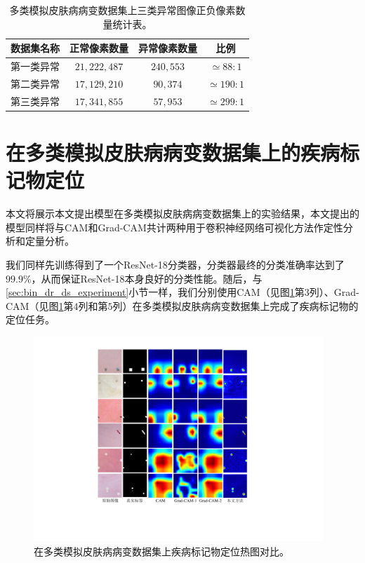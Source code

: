 \begin{table}[h]
	\centering
	\caption[多类模拟皮肤病病变数据集上三类异常图像正负像素数量统计表]{多类模拟皮肤病病变数据集上三类异常图像正负像素数量统计表。}
	\label{tab:multi_ds_pixel_freqs}
	\begin{tabular}{c|c|c|c}
		\toprule[2pt]
		数据集名称 & 正常像素数量 & 异常像素数量 & 比例 \\
		\midrule[2pt]
		第一类异常&  $21,222,487$ & $240,553$ & $\simeq 88: 1$ \\ \hline
		第二类异常&  $17,129,210$ & $90,374$ & $\simeq 190: 1$ \\ \hline
		第三类异常 & $17,341,855$ & $57,953$ & $\simeq 299: 1$ \\
		\bottomrule[2pt]
	\end{tabular}
\end{table}
\section{在多类模拟皮肤病病变数据集上的疾病标记物定位}\label{sec:multi_classes_experiments_res}
本文将展示本文提出模型在多类模拟皮肤病病变数据集上的实验结果，本文提出的模型同样将与CAM和Grad-CAM共计两种用于卷积神经网络可视化方法作定性分析和定量分析。

我们同样先训练得到了一个ResNet-18分类器，分类器最终的分类准确率达到了$99.9\%$，从而保证ResNet-18本身良好的分类性能。随后，与\ref{sec:bin_dr_ds_experiment}小节一样，我们分别使用CAM（见图\ref{fig:multi_simulated_skin_res}第$3$列）、Grad-CAM（见图\ref{fig:multi_simulated_skin_res}第$4$列和第$5$列）在多类模拟皮肤病病变数据集上完成了疾病标记物的定位任务。
\begin{figure}[h]
	\centering
	\includegraphics[width=0.975\textwidth]{figure/multi_simulated_skin_res.pdf}
	\caption[在多类模拟皮肤病病变数据集上疾病标记物定位热图对比]{在多类模拟皮肤病病变数据集上疾病标记物定位热图对比。}
	\label{fig:multi_simulated_skin_res}
\end{figure}

